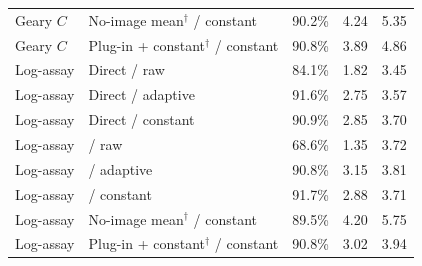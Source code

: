 \begin{longtable}{@{}llrrr@{}}
Geary $C$ & No-image mean$^\dagger$ / constant & 90.2\% & 4.24 & 5.35 \\
Geary $C$ & Plug-in + constant$^\dagger$ / constant & 90.8\% & 3.89 & 4.86 \\
Log-assay & Direct / raw & 84.1\% & 1.82 & 3.45 \\
Log-assay & Direct / adaptive & 91.6\% & 2.75 & 3.57 \\
Log-assay & Direct / constant & 90.9\% & 2.85 & 3.70 \\
Log-assay & \method{} / raw & 68.6\% & 1.35 & 3.72 \\
Log-assay & \method{} / adaptive & 90.8\% & 3.15 & 3.81 \\
Log-assay & \method{} / constant & 91.7\% & 2.88 & 3.71 \\
Log-assay & No-image mean$^\dagger$ / constant & 89.5\% & 4.20 & 5.75 \\
Log-assay & Plug-in + constant$^\dagger$ / constant & 90.8\% & 3.02 & 3.94 \\
\bottomrule
\end{longtable}
